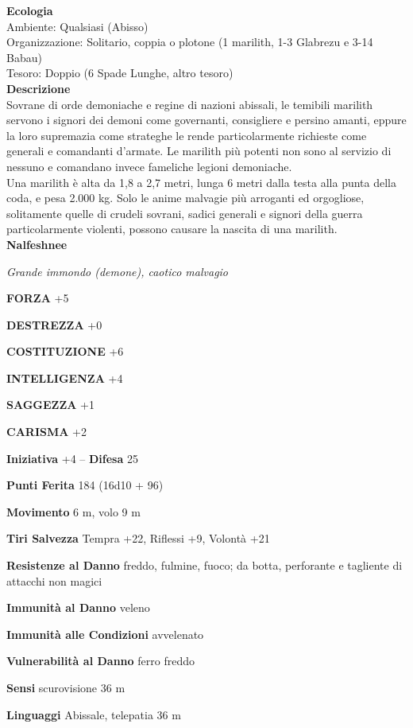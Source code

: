 \begin{multicols}{2}
\textbf{Ecologia}\\
Ambiente: Qualsiasi (Abisso)\\
Organizzazione: Solitario, coppia o plotone (1 marilith, 1-3 Glabrezu e 3-14 Babau)\\
Tesoro: Doppio (6 Spade Lunghe, altro tesoro)\\
\textbf{Descrizione}\\
Sovrane di orde demoniache e regine di nazioni abissali, le temibili marilith servono i signori dei demoni come governanti, consigliere e persino amanti, eppure la loro supremazia come strateghe le rende particolarmente richieste come generali e comandanti d'armate. Le marilith più potenti non sono al servizio di nessuno e comandano invece fameliche legioni demoniache.\\
Una marilith è alta da 1,8 a 2,7 metri, lunga 6 metri dalla testa alla punta della coda, e pesa 2.000 kg. Solo le anime malvagie più arroganti ed orgogliose, solitamente quelle di crudeli sovrani, sadici generali e signori della guerra particolarmente violenti, possono causare la nascita di una marilith.\\


\medskip{}\textbf{Nalfeshnee}

\emph{Grande immondo (demone), caotico malvagio}

\textbf{FORZA} +5

\textbf{DESTREZZA} +0

\textbf{COSTITUZIONE} +6

\textbf{INTELLIGENZA} +4

\textbf{SAGGEZZA} +1

\textbf{CARISMA} +2

\textbf{Iniziativa} +4 -- \textbf{Difesa} 25

\textbf{Punti Ferita} 184 (16d10 + 96)

\textbf{Movimento} 6 m, volo 9 m

\textbf{Tiri Salvezza} Tempra +22, Riflessi +9, Volontà +21

\textbf{Resistenze al Danno} freddo, fulmine, fuoco; da botta, perforante e tagliente di attacchi non magici

\textbf{Immunità al Danno} veleno

\textbf{Immunità alle Condizioni} avvelenato

\textbf{Vulnerabilità al Danno} ferro freddo

\textbf{Sensi} scurovisione 36 m

\textbf{Linguaggi} Abissale, telepatia 36 m 


\end{multicols}
